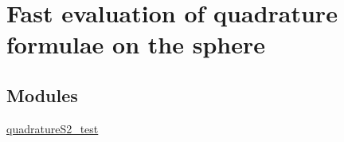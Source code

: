 \hypertarget{group__applications__quadratureS2}{
\section{Fast evaluation of quadrature formulae on the sphere}
\label{group__applications__quadratureS2}
}
\subsection*{Modules}
\begin{CompactItemize}
\item 
\hyperlink{group__applications__quadratureS2__test}{quadratureS2\_\-test}
\end{CompactItemize}
